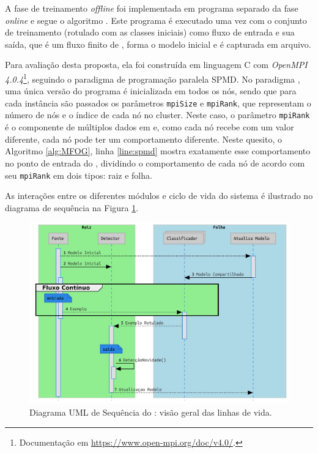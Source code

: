 A fase de treinamento \emph{offline} foi implementada em programa separado da
fase \emph{online} e segue o algoritmo \minas \cite{Faria2016minas}.
Este programa é executado uma vez com o conjunto de treinamento (rotulado com as
classes iniciais) como fluxo de entrada e sua saída, que é um fluxo finito de
\mclusters, forma o modelo inicial e é capturada em arquivo.


Para avaliação desta proposta, ela foi construída em linguagem C com
\emph{OpenMPI 4.0.4}\footnote{Documentação em
\url{https://www.open-mpi.org/doc/v4.0/}.}, seguindo o paradigma de programação
paralela \acf{SPMD}.
No paradigma \spmd, uma única versão do programa é inicializada em todos os nós, sendo que
para cada instância são passados os parâmetros \texttt{mpiSize} e
\texttt{mpiRank}, que representam o número de nós e o índice de cada nó no
cluster.
Neste caso, o parâmetro \texttt{mpiRank} é o componente de múltiplos dados em
\spmd e, como cada nó recebe com um valor diferente, cada nó pode ter um
comportamento diferente.
Neste quesito, o Algoritmo \ref{alg:MFOG}, linha \ref{line:spmd} mostra
exatamente esse comportamento no ponto de entrada do \mfog, dividindo o
comportamento de cada nó de acordo com seu \texttt{mpiRank} em dois tipos: raiz
e folha.

As interações entre os diferentes módulos e ciclo de vida do sistema é ilustrado
no diagrama de sequência na Figura \ref{fig:mfog-mpi-life}.

\begin{figure}[htb]
  \centerline{
    \includegraphics[width=0.80\linewidth,page=1]{figures/lifecycle-uml-svg.pdf}
  }
  \caption{Diagrama UML de Sequência do \mfog: visão geral das linhas de vida.}
  \label{fig:mfog-mpi-life}
\end{figure}

